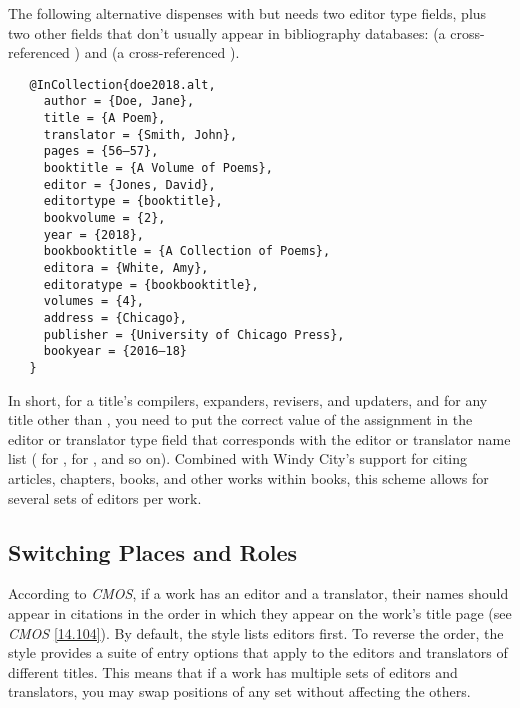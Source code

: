 \documentclass[11pt,letterpaper,oneside]{article}
\begin{document}
\begin{citebib}
\item \cite[56]{doe2018}
\end{citebib}

\noindent The following alternative dispenses with 
but needs two editor type fields, plus two other fields that don't
usually appear in bibliography databases:  (a
cross-referenced ) and  (a
cross-referenced ).

\begin{verbatim}
   @InCollection{doe2018.alt,
     author = {Doe, Jane},
     title = {A Poem},
     translator = {Smith, John},
     pages = {56–57},
     booktitle = {A Volume of Poems},
     editor = {Jones, David},
     editortype = {booktitle},
     bookvolume = {2},
     year = {2018},
     bookbooktitle = {A Collection of Poems},
     editora = {White, Amy},
     editoratype = {bookbooktitle},
     volumes = {4},
     address = {Chicago},
     publisher = {University of Chicago Press},
     bookyear = {2016–18}
   }
\end{verbatim}

\begin{citebib}
\item \cite[56]{doe2018.alt}
\end{citebib}

In short, for a title's compilers, expanders, revisers, and updaters,
and for any title other than , you need to put the
correct value of the assignment in the editor or translator type field
that corresponds with the editor or translator name list
( for ,
 for , and so on).
Combined with Windy City's support for citing articles, chapters,
books, and other works within books, this scheme allows for several
sets of editors per work.

\subsection{Switching Places and Roles}
\label{editors:swap}

According to \textit{CMOS}, if a work has an editor and a translator,
their names should appear in citations in the order in which they
appear on the work's title page (see \textit{CMOS} \ref{14.104}). By
default, the style lists editors first. To reverse the order, the
style provides a suite of entry options that apply to the editors and
translators of different titles. This means that if a work has
multiple sets of editors and translators, you may swap positions of
any set without affecting the others.
\end{document}
